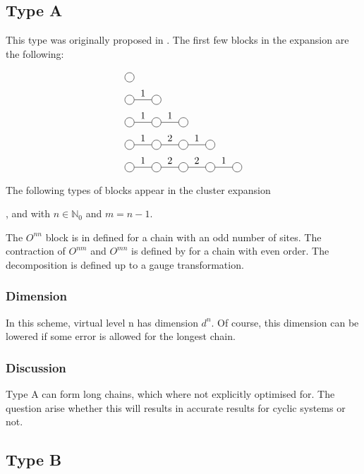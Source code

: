 
\subsection{Type A}
This type was originally proposed in \cite{Vanhecke2021}. The first few blocks in the expansion are the following:

\begin{equation}
    \begin{split}
        &\mpob{1}{ {,}  }{}{}{}{{,,}} \\
        &\mpob{2}{ {,"1",}  }{}{}{}{{,,}}\\
        &\mpob{3}{ {,"1","1",}  }{}{}{}{{,,,}}\\
        &\mpob{4}{ {,"1","2","1",}  }{}{}{}{{,,,,,}}\\
        &\mpob{5}{ {,"1","2","2","1",}  }{}{}{}{{,,,,,}}\\
    \end{split}
\end{equation}

The following types of blocks appear in the cluster expansion

, and  with $n \in \mathbb{N}_0$ and $m=n-1$.

The $O^{n n}$ block is in defined for a chain with an odd number of sites. The contraction of $O^{n m }$ and $O^{m n} $ is defined by for a chain with even order. The decomposition is defined up to a gauge transformation.

\subsubsection{Dimension}

In this scheme, virtual level n has dimension $d^n$. Of course, this dimension can be lowered if some error is allowed for the longest chain.

\subsubsection{Discussion}

Type A can form long chains, which where not explicitly optimised for. The question arise whether this will results in accurate results for cyclic systems or not.

\subsection{Type B}

